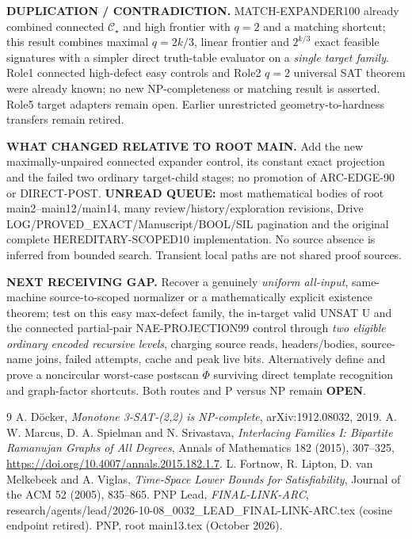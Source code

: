 \documentclass[11pt]{article}
\newcommand{\CS}{\mathcal C_\star}
\begin{document}
\noindent\textbf{DUPLICATION / CONTRADICTION.} MATCH-EXPANDER100 already combined connected $\CS$ and high frontier with $q=2$ and a matching shortcut; this result combines maximal $q=2k/3$, linear frontier and $2^{k/3}$ exact feasible signatures with a simpler direct truth-table evaluator on a \emph{single target family}. Role1 connected high-defect easy controls and Role2 $q=2$ universal SAT theorem were already known; no new NP-completeness or matching result is asserted. Role5 target adapters remain open. Earlier unrestricted geometry-to-hardness transfers remain retired.

\noindent\textbf{WHAT CHANGED RELATIVE TO ROOT MAIN.} Add the new maximally-unpaired connected expander control, its constant exact projection and the failed two ordinary target-child stages; no promotion of ARC-EDGE-90 or DIRECT-POST. \textbf{UNREAD QUEUE:} most mathematical bodies of root main2--main12/main14, many review/history/exploration revisions, Drive LOG/PROVED_EXACT/Manuscript/BOOL/SIL pagination and the original complete HEREDITARY-SCOPED10 implementation. No source absence is inferred from bounded search. Transient local paths are not shared proof sources.

\noindent\textbf{NEXT RECEIVING GAP.} Recover a genuinely \emph{uniform all-input}, same-machine source-to-scoped normalizer or a mathematically explicit existence theorem; test on this easy max-defect family, the in-target valid UNSAT U and the connected partial-pair NAE-PROJECTION99 control through \emph{two eligible ordinary encoded recursive levels}, charging source reads, headers/bodies, source-name joins, failed attempts, cache and peak live bits. Alternatively define and prove a noncircular worst-case postscan $\Phi$ surviving direct template recognition and graph-factor shortcuts. Both routes and P versus NP remain \textbf{OPEN}.

\begin{thebibliography}{9}
 A. D\"ocker, \emph{Monotone 3-SAT-(2,2) is NP-complete}, arXiv:1912.08032, 2019.
 A. W. Marcus, D. A. Spielman and N. Srivastava, \emph{Interlacing Families I: Bipartite Ramanujan Graphs of All Degrees}, Annals of Mathematics 182 (2015), 307--325, \url{https://doi.org/10.4007/annals.2015.182.1.7}.
 L. Fortnow, R. Lipton, D. van Melkebeek and A. Viglas, \emph{Time-Space Lower Bounds for Satisfiability}, Journal of the ACM 52 (2005), 835--865.
 PNP Lead, \emph{FINAL-LINK-ARC}, research/agents/lead/2026-10-08\_0032\_LEAD\_FINAL-LINK-ARC.tex (cosine endpoint retired).
 PNP, root main13.tex (October 2026).
\end{thebibliography}
\end{document}
